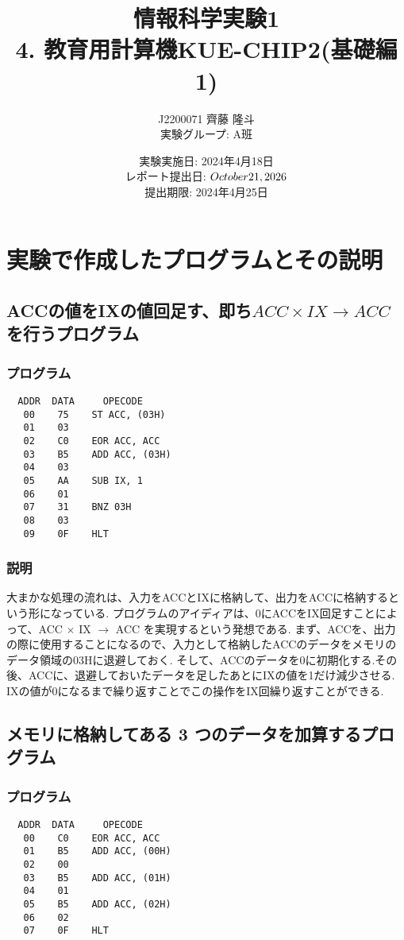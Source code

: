 \documentclass[titlepage]{jsarticle}
\title{情報科学実験1 \\ 4. 教育用計算機KUE-CHIP2(基礎編1)}
\author{J2200071 齊藤 隆斗 \\ 実験グループ: A班}
\date{実験実施日: 2024年4月18日 \\ レポート提出日: $\today$ \\ 提出期限: 2024年4月25日}
\theoremstyle{definition}
\begin{document}
\maketitle

\section{実験で作成したプログラムとその説明}

\subsection{ACCの値をIXの値回足す、即ち$ACC \times IX \rightarrow ACC$を行うプログラム}

\subsubsection{プログラム}

\begin{lstlisting}
  ADDR  DATA     OPECODE
   00    75    ST ACC, (03H)
   01    03
   02    C0    EOR ACC, ACC
   03    B5    ADD ACC, (03H)
   04    03
   05    AA    SUB IX, 1
   06    01
   07    31    BNZ 03H
   08    03
   09    0F    HLT
\end{lstlisting}

\subsubsection{説明}
大まかな処理の流れは、入力をACCとIXに格納して、出力をACCに格納するという形になっている.
プログラムのアイディアは、0にACCをIX回足すことによって、ACC $\times$ IX $\rightarrow$ ACC を実現するという発想である.
まず、ACCを、出力の際に使用することになるので、入力として格納したACCのデータをメモリのデータ領域の03Hに退避しておく.
そして、ACCのデータを0に初期化する.その後、ACCに、退避しておいたデータを足したあとにIXの値を1だけ減少させる.
IXの値が0になるまで繰り返すことでこの操作をIX回繰り返すことができる.

\subsection{メモリに格納してある 3 つのデータを加算するプログラム}

\subsubsection{プログラム}

\begin{lstlisting}
  ADDR  DATA     OPECODE
   00    C0    EOR ACC, ACC
   01    B5    ADD ACC, (00H)
   02    00
   03    B5    ADD ACC, (01H)
   04    01
   05    B5    ADD ACC, (02H)
   06    02
   07    0F    HLT
\end{lstlisting}
\end{document}
